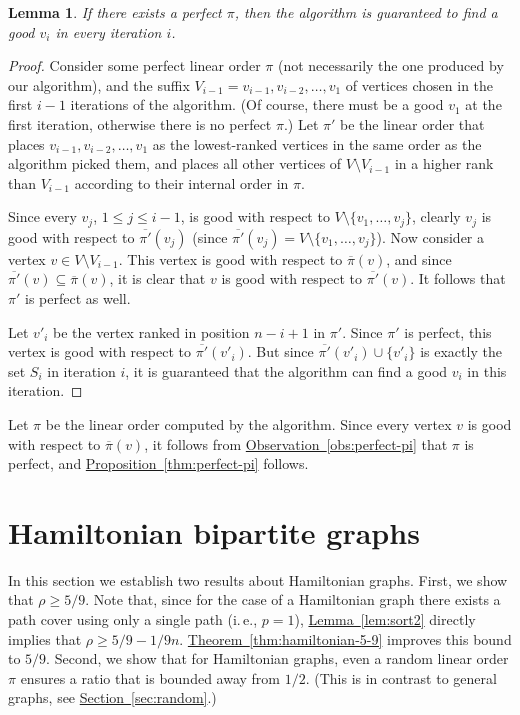 \documentclass[11pt]{article}
\numberwithin{equation}{section}
\newtheorem{lemma}[theorem]{Lemma}
\theoremstyle{definition}
\theoremstyle{plain}
\newcommand{\ie}{i.\,e.}
\newcommand{\expref}[2]{\hyperref[#2]{#1~\ref{#2}}}
\theoremstyle{plain}
\newcommand{\precvpi}{\overline{\pi}(v)}
\begin{document}
\begin{lemma}
	If there exists a perfect $\pi$, then the algorithm is guaranteed to find a good $v_i$ in every iteration $i$.
\end{lemma}
\begin{proof}
	Consider some perfect linear order $\pi$ (not necessarily the one produced by our algorithm), and the suffix $V_{i-1}=v_{i-1},v_{i-2},\ldots,v_1$ of vertices chosen in the first $i-1$ iterations of the
algorithm. %
(Of course, there must be a good $v_1$ at the first iteration, otherwise there is no perfect $\pi$.)  %
 Let $\pi'$ be the linear order that places $v_{i-1},v_{i-2},\ldots,v_1$ as the lowest-ranked %
vertices in the same order as the algorithm picked them, and places all other vertices of $V\setminus V_{i-1}$ in a higher rank than $V_{i-1}$ according to their internal order in $\pi$.
	
Since every $v_j$, $1\leq j\leq i-1$, is good with respect to $V\setminus \{v_1,\ldots, v_{j}\}$, %
clearly $v_j$ is good with respect to $\overline{\pi'}(v_j)$ (since $\overline{\pi'}(v_j) = V\setminus \{v_1,\ldots, v_{j}\}$). Now consider a vertex $v\in V\setminus V_{i-1}$. This vertex is good with respect to $\precvpi$, and since $\overline{\pi'}(v)\subseteq  \precvpi$, it is clear that $v$ is good with respect to $\overline{\pi'}(v)$. It follows that $\pi'$ is perfect as well.
	
	Let $v'_{i}$ be the vertex ranked in position $n-i+1$ in $\pi'$. Since $\pi'$ is perfect, this vertex is good with respect to $\overline{\pi'}(v'_i)$. But since $\overline{\pi'}(v'_i)\cup \{v'_{i}\}$ is exactly the set $S_i$ in iteration $i$, it is guaranteed that the algorithm can find a good $v_i$ in this iteration.
\end{proof}

Let $\pi$ be the linear order computed by the algorithm. Since every vertex $v$ is good with respect to $\precvpi$, it follows from \expref{Observation}{obs:perfect-pi} that $\pi$ is perfect, and \expref{Proposition}{thm:perfect-pi} follows. 


\section{Hamiltonian bipartite graphs}
\label{sec:hamiltonian}

In this section we establish two results about Hamiltonian graphs.
First, we show that %
$\rho \ge 5/9$.   %
Note that, since for the case of a Hamiltonian graph there exists a path cover using only a single path
%
(\ie, $p=1$), \expref{Lemma}{lem:sort2} directly implies that 
%
$\rho \ge 5/9 - 1/9n$.
\expref{Theorem}{thm:hamiltonian-5-9} improves this bound to $5/9$.
Second, we show that for Hamiltonian graphs, even a random linear order $\pi$ ensures a ratio that is bounded away from %
$1/2$.  %
(This is in contrast to general graphs, see \expref{Section}{sec:random}.) %
\end{document}
